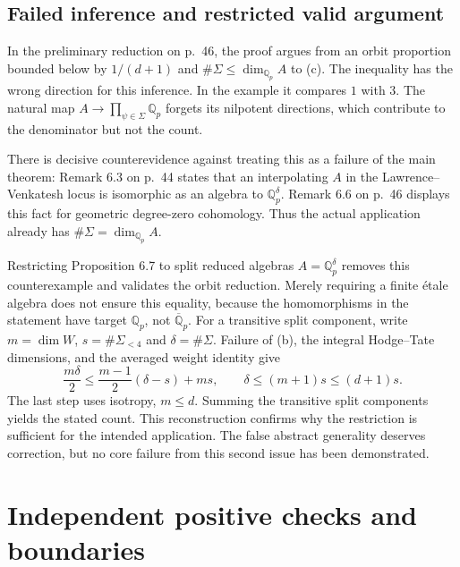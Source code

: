 \documentclass[10pt]{article}
\begin{document}
\subsection*{Failed inference and restricted valid argument}
In the preliminary reduction on p. 46, the proof argues from an orbit proportion bounded below by \(1/(d+1)\) and \(\#\Sigma\leq\dim_{\mathbb Q_p}A\) to (c). The inequality has the wrong direction for this inference. In the example it compares \(1\) with \(3\). The natural map \(A\to\prod_{\psi\in\Sigma}\mathbb Q_p\) forgets its nilpotent directions, which contribute to the denominator but not the count.\par
There is decisive counterevidence against treating this as a failure of the main theorem: Remark 6.3 on p. 44 states that an interpolating \(A\) in the Lawrence–Venkatesh locus is isomorphic as an algebra to \(\mathbb Q_p^\delta\). Remark 6.6 on p. 46 displays this fact for geometric degree-zero cohomology. Thus the actual application already has \(\#\Sigma=\dim_{\mathbb Q_p}A\).\par
Restricting Proposition 6.7 to split reduced algebras \(A=\mathbb Q_p^\delta\) removes this counterexample and validates the orbit reduction. Merely requiring a finite étale algebra does not ensure this equality, because the homomorphisms in the statement have target \(\mathbb Q_p\), not \(\overline{\mathbb Q}_p\). For a transitive split component, write \(m=\dim W\), \(s=\#\Sigma_{<4}\) and \(\delta=\#\Sigma\). Failure of (b), the integral Hodge–Tate dimensions, and the averaged weight identity give \[\frac{m\delta}{2}
 \leq\frac{m-1}{2}(\delta-s)+ms,
\qquad
\delta\leq(m+1)s\leq(d+1)s.\] The last step uses isotropy, \(m\leq d\). Summing the transitive split components yields the stated count. This reconstruction confirms why the restriction is sufficient for the intended application. The false abstract generality deserves correction, but no core failure from this second issue has been demonstrated.\par
\section*{Independent positive checks and boundaries}
\end{document}
